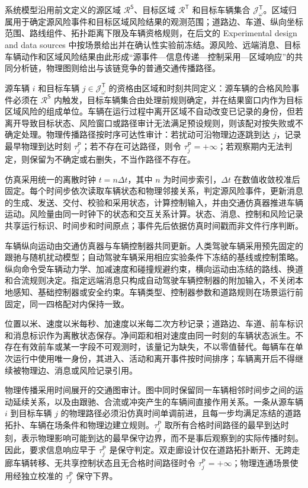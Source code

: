 \documentclass[10pt,a4paper,twocolumn]{article}
\begin{document}
系统模型沿用前文定义的源区域 $\mathcal R^{\mathsf S}$、目标区域 $\mathcal R^{\mathsf T}$ 和目标车辆集合 $\mathcal J^{\mathsf T}_{\omega}$。区域归属用于确定源风险事件和目标区域风险结果的观测范围；道路边、车道、纵向坐标范围、路线组件、拓扑距离下限及车辆资格规则，在后文的 Experimental design and data sources 中按场景给出并在确认性实验前冻结。源风险、远端消息、目标车辆动作和区域风险结果由此形成“源事件—信息传递—控制采用—区域响应”的共同分析链，物理图则给出与该链竞争的普通交通传播路径。

源车辆 $i$ 和目标车辆 $j\in\mathcal J^{\mathsf T}_{\omega}$ 的资格由区域和时刻共同定义：源车辆的合格风险事件必须在 $\mathcal R^{\mathsf S}$ 内触发，目标车辆集合由处理前规则确定，并在结果窗口内作为目标区域风险的组成单位。车辆在运行过程中离开区域不自动改变已记录的身份，但若离开导致目标状态、风险窗口或路径审计无法满足预设规则，则该配对按失败或不确定处理。物理传播路径按时序可达性审计：若扰动可沿物理边逐跳到达 $j$，记录最早物理到达时刻 $\tau_j^{\mathsf P}$；若不存在可达路径，则令 $\tau_j^{\mathsf P}=+\infty$；若观察期内无法判定，则保留为不确定或右删失，不当作路径不存在。

仿真采用统一的离散时钟 $t=n\Delta t$，其中 $n$ 为时间步索引，$\Delta t$ 在数值收敛校准后固定。每个时间步依次读取车辆状态和物理邻接关系，判定源风险事件，更新消息的生成、发送、交付、校验和采用状态，计算控制输入，并由交通仿真器推进车辆运动。风险量由同一时钟下的状态和交互关系计算。状态、消息、控制和风险记录共享运行标识、时间步和时间原点；事件先后依据仿真时间戳而非文件行序判断。

车辆纵向运动由交通仿真器与车辆控制器共同更新。人类驾驶车辆采用预先固定的跟驰与随机扰动模型；自动驾驶车辆采用相应实验条件下冻结的基线或控制策略。纵向命令受车辆动力学、加减速度和碰撞规避约束，横向运动由冻结的路线、换道和合流规则决定。指定远端消息只构成自动驾驶车辆控制器的附加输入，不关闭本地感知、基础控制器或安全约束。车辆类型、控制器参数和道路规则在场景运行前固定，同一四格配对内保持一致。

位置以米、速度以米每秒、加速度以米每二次方秒记录；道路边、车道、前车标识和消息标识作为离散状态保存。净间距和相对速度由同一时刻的车辆状态派生。不存在有效前车或某一字段不可观测时，该量记为缺失，不以零值替代。每辆车在单次运行中使用唯一身份，其进入、活动和离开事件按时间排序；车辆离开后不得继续被物理边、消息或风险记录引用。

物理传播采用时间展开的交通图审计。图中同时保留同一车辆相邻时间步之间的运动延续关系，以及由跟驰、合流或冲突产生的车辆间直接作用关系。一条从源车辆 $i$ 到目标车辆 $j$ 的物理路径必须沿仿真时间单调前进，且每一步均满足冻结的道路拓扑、车辆在场条件和物理边建立规则。$\tau_j^{\mathsf P}$ 取所有合格时间路径的最早到达时刻，表示物理影响可能到达的最早保守边界，而不是事后观察到的实际传播时刻。因此，要求信息响应早于 $\tau_j^{\mathsf P}$ 是保守判定。双走廊设计仅在道路拓扑断开、无跨走廊车辆转移、无共享控制状态且无合格时间路径时令 $\tau_j^{\mathsf P}=+\infty$；物理连通场景使用经独立校准的 $\tau_j^{\mathsf P}$ 保守下界。
\end{document}

